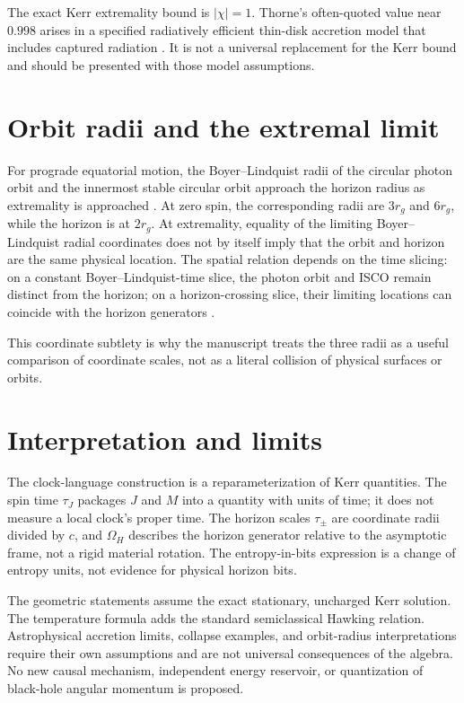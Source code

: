\documentclass[12pt]{article}
\begin{document}
The exact Kerr extremality bound is $|\chi|=1$. Thorne's often-quoted value near $0.998$ arises in a specified radiatively efficient thin-disk accretion model that includes captured radiation \cite{Thorne}. It is not a universal replacement for the Kerr bound and should be presented with those model assumptions.

\section{Orbit radii and the extremal limit}

For prograde equatorial motion, the Boyer--Lindquist radii of the circular photon orbit and the innermost stable circular orbit approach the horizon radius as extremality is approached \cite{BardeenPressTeukolsky}. At zero spin, the corresponding radii are $3r_g$ and $6r_g$, while the horizon is at $2r_g$. At extremality, equality of the limiting Boyer--Lindquist radial coordinates does not by itself imply that the orbit and horizon are the same physical location. The spatial relation depends on the time slicing: on a constant Boyer--Lindquist-time slice, the photon orbit and ISCO remain distinct from the horizon; on a horizon-crossing slice, their limiting locations can coincide with the horizon generators \cite{Jacobson}.

This coordinate subtlety is why the manuscript treats the three radii as a useful comparison of coordinate scales, not as a literal collision of physical surfaces or orbits.

\section{Interpretation and limits}

The clock-language construction is a reparameterization of Kerr quantities. The spin time $\tau_J$ packages $J$ and $M$ into a quantity with units of time; it does not measure a local clock's proper time. The horizon scales $\tau_\pm$ are coordinate radii divided by $c$, and $\Omega_H$ describes the horizon generator relative to the asymptotic frame, not a rigid material rotation. The entropy-in-bits expression is a change of entropy units, not evidence for physical horizon bits.

The geometric statements assume the exact stationary, uncharged Kerr solution. The temperature formula adds the standard semiclassical Hawking relation. Astrophysical accretion limits, collapse examples, and orbit-radius interpretations require their own assumptions and are not universal consequences of the algebra. No new causal mechanism, independent energy reservoir, or quantization of black-hole angular momentum is proposed.
\end{document}
